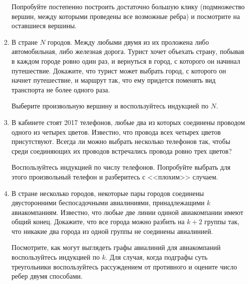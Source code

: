 \begin{enumerate}
        \begin{hint}
            Попробуйте постепенно построить достаточно большую клику
            (подмножество вершин, между которыми проведены все
            возможные ребра) и посмотрите на оставшиеся вершины.
        \end{hint}
    \item В стране $N$ городов. Между любыми двумя из их проложена
        либо автомобильная, либо железная дорога. Турист хочет
        объехать страну, побывав в каждом городе ровно один раз,
        и вернуться в город, с которого он начинал путешествие.
        Докажите, что турист может выбрать город, с которого он
        начнет путешествие, и маршрут так, что ему придется поменять
        вид транспорта не более одного раза.
        \begin{hint}
            Выберите произвольную вершину и воспользуйтесь индукцией
            по $N$.
        \end{hint}
    \item В кабинете стоят 2017 телефонов, любые два из которых
        соединены проводом одного из четырех цветов. Известно, что
        провода всех четырех цветов присутствуют. Всегда ли можно
        выбрать несколько телефонов так, чтобы среди соединяющих
        их проводов встречались провода ровно трех цветов?
        \begin{hint}
            Воспользуйтесь индукцией по числу телефонов. Попробуйте
            выбрать для этого произвольный телефон и разберитесь с
            <<плохим>> случаем.
        \end{hint}
    \item В стране несколько городов, некоторые пары городов 
        соединены двусторонними беспосадочными авиалиниями,
        принадлежащими $k$ авиакомпаниям. Известно, что любые две
        линии однной авиакомпании имеют общий конец. Докажите, что 
        все города можно разбить на $k + 2$ группы так, что никакие 
        два города из одной группы не соединены авиалинией.
        \begin{hint}
            Посмотрите, как могут выглядеть графы авиалиний для
            авиакомпаний воспользуйтесь индукцией по $k$. Для
            случая, когда подграфы суть треугольники воспользуйтесь
            рассуждением от противного и оцените число ребер двумя
            способами.
        \end{hint}
\end{enumerate}
